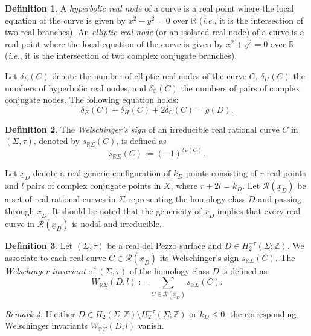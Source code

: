\documentclass[11pt]{amsart}
\numberwithin{equation}{section}
\theoremstyle{definition}
\newtheorem{definition}{Definition}[section]
\theoremstyle{plain}
\theoremstyle{remark}
\newtheorem{remark}[definition]{Remark}
\newcommand{\R}{\mathbb{R}}
\newcommand{\Z}{\mathbb{Z}}
\newcommand{\C}{\mathbb{C}}
\begin{document}
 \begin{definition}
   A \emph{hyperbolic real node} of a curve is  a real point where the 
   local equation of the curve is given by $x^2-y^2=0$ over $\R$ (\textit{i.e.}, it is the intersection of two real branches).
   An \emph{elliptic real node} (or an isolated real node) of a curve is a real point where the  local equation of the curve is given by $x^2+y^2=0$ over  $\R$ (\textit{i.e.}, it is the intersection of two complex conjugate branches).
\end{definition}

  
 Let  $\delta_E(C)$ denote the number of elliptic real nodes of the curve $C$, $\delta_H(C)$  the numbers of hyperbolic real nodes, and $\delta_{\C}(C)$ the numbers of pairs of complex conjugate nodes. The following equation holds:
 $$\delta_E(C)+\delta_H(C)+2\delta_{\C}(C)=g(D).$$

\begin{definition} \label{def-sign.curve.w.node.dim2}
The \emph{Welschinger's sign} of an irreducible real rational curve $C$ in $(\Sigma,\tau)$, denoted by $s_{\R \Sigma}(C)$, is defined as  
$$s_{\R \Sigma}(C):=(-1)^{\delta_E(C)}.$$
\end{definition}



Let $\underline{x}_D$ denote a real generic  configuration of $k_D$ points consisting of $r$ real points and $l$ pairs of complex conjugate points in $X$, where $r+2l=k_D$.  
Let $\mathcal{R}(\underline{x}_D)$ be a set of real  rational curves in $\Sigma$ representing the homology class $D$ and passing through $\underline{x}_D$.
It should be noted that the genericity of $\underline{x}_D$  implies that every real curve in $\mathcal{R}(\underline{x}_D)$ is nodal and irreducible. 

\begin{definition}\label{def-Welschinger.Inv.Nodes}
Let $(\Sigma,\tau)$ be a real del Pezzo surface and $D\in H_2^{-\tau}(\Sigma;\Z)$. We associate to each real curve $C\in \mathcal{R}(\underline{x}_D)$ its Welschinger's sign $s_{\R \Sigma}(C)$. The \emph{Welschinger invariant}  of $(\Sigma,\tau)$ of the homology class $D$ is defined as 
 $$W_{\R \Sigma}(D,l):=\sum_{C\in \mathcal{R}(\underline{x}_D)}s_{\R \Sigma}(C).$$
\end{definition}

\begin{remark}
If either $D\in H_2(\Sigma;\Z) \setminus H_2^{-\tau}(\Sigma;\Z)$ or $k_D\leq 0$, the corresponding Welschinger invariants $W_{\R \Sigma} (D,l)$ vanish.
\end{remark}
\end{document}
